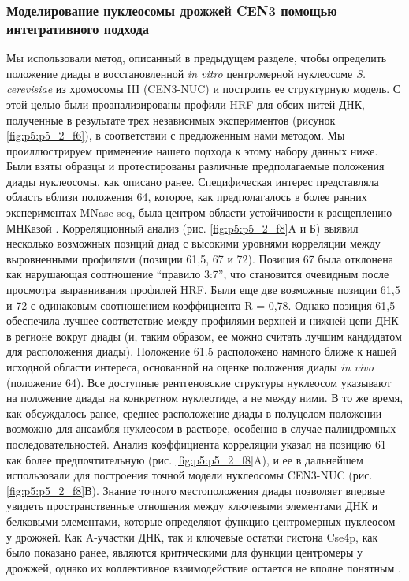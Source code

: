 \subsubsection{Моделирование нуклеосомы дрожжей CEN3 помощью интегративного подхода}
Мы использовали метод, описанный в предыдущем разделе, чтобы определить положение диады в восстановленной \textit{in vitro} центромерной нуклеосоме \textit{S. cerevisiae} из хромосомы III (CEN3-NUC) и построить ее структурную модель. С этой целью были проанализированы профили HRF для обеих нитей ДНК, полученные в результате трех независимых экспериментов (рисунок \ref{fig:p5:p5_2_f6}), в соответствии с предложенным нами методом. Мы проиллюстрируем применение нашего подхода к этому набору данных ниже. Были взяты образцы и протестированы различные предполагаемые положения диады нуклеосомы, как описано ранее. Специфическая интерес представляла область вблизи положения 64, которое, как предполагалось в более ранних экспериментах MNase-seq, была центром области устойчивости к расщеплению МНКазой \cite{cole_centromeric_2011}. Корреляционный анализ (рис. \ref{fig:p5:p5_2_f8}A и Б) выявил несколько возможных позиций диад с высокими уровнями корреляции между выровненными профилями (позиции 61,5, 67 и 72). Позиция 67 была отклонена как нарушающая соотношение ``правило 3:7'', что становится очевидным после просмотра выравнивания профилей HRF. Были еще две возможные позиции 61,5 и 72 с одинаковым соотношением коэффициента R = 0,78. Однако позиция 61,5 обеспечила лучшее соответствие между профилями верхней и нижней цепи ДНК в регионе вокруг диады (и, таким образом, ее можно считать лучшим кандидатом для расположения диады). Положение 61.5 расположено намного ближе к нашей исходной области интереса, основанной на оценке положения диады \textit{in vivo} (положение 64).
Все доступные рентгеновские структуры нуклеосом указывают на положение диады на конкретном нуклеотиде, а не между ними. В то же время, как обсуждалось ранее, среднее расположение диады в полуцелом положении возможно для ансамбля нуклеосом в растворе, особенно в случае палиндромных последовательностей. Анализ коэффициента корреляции указал на позицию 61 как более предпочтительную (рис. \ref{fig:p5:p5_2_f8}A), и ее в дальнейшем использовали для построения точной модели нуклеосомы CEN3-NUC (рис. \ref{fig:p5:p5_2_f8}В).
Знание точного местоположения диады позволяет впервые увидеть пространственные отношения между ключевыми элементами ДНК и белковыми элементами, которые определяют функцию центромерных нуклеосом у дрожжей. Как A-участки ДНК, так и ключевые остатки гистона Cse4p, как было показано ранее, являются критическими для функции центромеры у дрожжей, однако их коллективное взаимодействие остается не вполне понятным \cite{baker_genetic_2005,malik_major_2009}.

